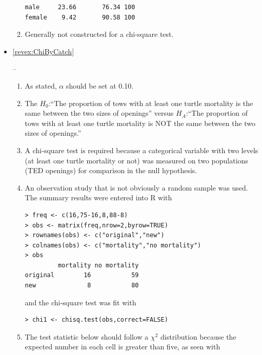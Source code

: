 \documentclass[10pt,openany]{book}\usepackage[]{graphicx}\usepackage[]{color}
\makeatletter
\newenvironment{kframe}{%
 \def\at@end@of@kframe{}%
 \ifinner\ifhmode%
  \def\at@end@of@kframe{\end{minipage}}%
  \begin{minipage}{\columnwidth}%
 \fi\fi%
 \def\FrameCommand##1{\hskip\@totalleftmargin \hskip-\fboxsep
 \colorbox{shadecolor}{##1}\hskip-\fboxsep
     \hskip-\linewidth \hskip-\@totalleftmargin \hskip\columnwidth}%
 \MakeFramed {\advance\hsize-\width
   \@totalleftmargin\z@ \linewidth\hsize
   \@setminipage}}%
 {\par\unskip\endMakeFramed%
 \at@end@of@kframe}
\newenvironment{knitrout}{}{} %
\makeatother
\begin{document}
\begin{itemize}
\begin{enumerate}
\begin{knitrout}
\begin{kframe}
\begin{verbatim}
male     23.66       76.34 100
female    9.42       90.58 100
\end{verbatim}
\end{kframe}
\end{knitrout}
      \item Generally not constructed for a chi-square test.
    \end{enumerate}
  \item \hypertarget{ans:ChiByCatch}{\ref{revex:ChiByCatch}} --
    \begin{enumerate}
      \item As stated, $\alpha$ should be set at 0.10.
      \item The $H_{0}$:``The proportion of tows with at least one turtle mortality is the same between the two sizes of openings'' versus $H_{A}$:``The proportion of tows with at least one turtle mortality is NOT the same between the two sizes of openings.''
      \item A chi-square test is required because a categorical variable with two levels (at least one turtle mortality or not) was measured on two populations (TED openings) for comparison in the null hypothesis.
      \item An observation study that is not obviously a random sample was used.  The summary results were entered into R with
\begin{knitrout}
\color{fgcolor}\begin{kframe}
\begin{verbatim}
> freq <- c(16,75-16,8,88-8)
> obs <- matrix(freq,nrow=2,byrow=TRUE)
> rownames(obs) <- c("original","new")
> colnames(obs) <- c("mortality","no mortality")
> obs
         mortality no mortality
original        16           59
new              8           80
\end{verbatim}
\end{kframe}
\end{knitrout}
and the chi-square test was fit with
\begin{knitrout}
\color{fgcolor}\begin{kframe}
\begin{verbatim}
> chi1 <- chisq.test(obs,correct=FALSE)
\end{verbatim}
\end{kframe}
\end{knitrout}
      \item The test statistic below should follow a $\chi^{2}$ distribution because the expected number in each cell is greater than five, as seen with

\end{enumerate}
\end{itemize}
\end{document}
